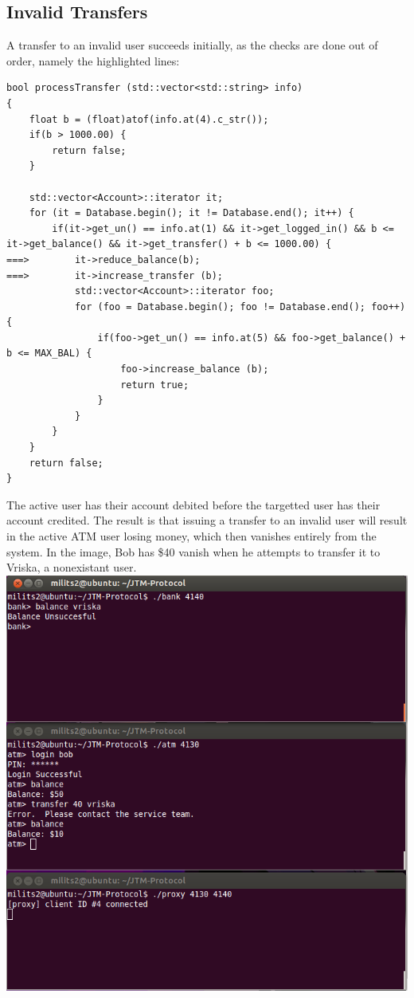 \documentclass{article}
\begin{document}
\subsection{Invalid Transfers}
A transfer to an invalid user succeeds initially, as the checks are done out of order, namely the highlighted lines:
\begin{lstlisting}
bool processTransfer (std::vector<std::string> info)
{
	float b = (float)atof(info.at(4).c_str());
	if(b > 1000.00) {
		return false;
	}

	std::vector<Account>::iterator it;
	for (it = Database.begin(); it != Database.end(); it++) {
		if(it->get_un() == info.at(1) && it->get_logged_in() && b <= it->get_balance() && it->get_transfer() + b <= 1000.00) {
===>		it->reduce_balance(b);
===>		it->increase_transfer (b);
			std::vector<Account>::iterator foo;
			for (foo = Database.begin(); foo != Database.end(); foo++) {
				if(foo->get_un() == info.at(5) && foo->get_balance() + b <= MAX_BAL) {
					foo->increase_balance (b);
					return true;
				}
			}
		}
	}
	return false;
}
\end{lstlisting}
The active user has their account debited before the targetted user has their account credited. The result is that issuing a transfer to an invalid user will result in the active ATM user losing money, which then vanishes entirely from the system. In the image, Bob has \$40 vanish when he attempts to transfer it to Vriska, a nonexistant user.
\\
\includegraphics[scale=0.85]{transferLoss.png}
\\
\end{document}

